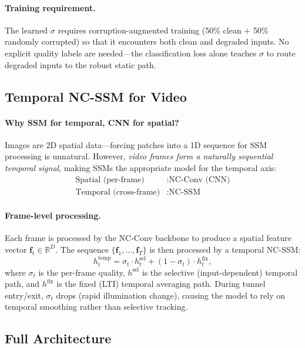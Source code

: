 \documentclass[10pt,twocolumn,letterpaper]{article}
\begin{document}
\paragraph{Training requirement.}
The learned $\sigma$ requires corruption-augmented training (50\% clean + 50\% randomly corrupted) so that it encounters both clean and degraded inputs.
No explicit quality labels are needed---the classification loss alone teaches $\sigma$ to route degraded inputs to the robust static path.


\subsection{Temporal NC-SSM for Video}
\label{sec:temporal}

\paragraph{Why SSM for temporal, CNN for spatial?}
Images are 2D spatial data---forcing patches into a 1D sequence for SSM processing is unnatural.
However, \emph{video frames form a naturally sequential temporal signal}, making SSMs the appropriate model for the temporal axis:
\begin{align}
\text{Spatial (per-frame)}&: \text{NC-Conv (CNN)} \nonumber \\
\text{Temporal (cross-frame)}&: \text{NC-SSM}
\end{align}

\paragraph{Frame-level processing.}
Each frame is processed by the NC-Conv backbone to produce a spatial feature vector $\mathbf{f}_t \in \mathbb{R}^D$.
The sequence $\{\mathbf{f}_1, \ldots, \mathbf{f}_T\}$ is then processed by a temporal NC-SSM:
\begin{equation}
h_t^{\text{temp}} = \sigma_t \cdot h_t^{\text{sel}} + (1-\sigma_t) \cdot h_t^{\text{fix}},
\end{equation}
where $\sigma_t$ is the per-frame quality, $h^{\text{sel}}$ is the selective (input-dependent) temporal path, and $h^{\text{fix}}$ is the fixed (LTI) temporal averaging path.
During tunnel entry/exit, $\sigma_t$ drops (rapid illumination change), causing the model to rely on temporal smoothing rather than selective tracking.


\subsection{Full Architecture}
\end{document}
